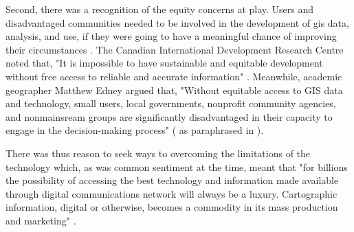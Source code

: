 \documentclass[notitlepage]{article}
\begin{document}
%

Second, there was a recognition of the equity concerns at play. Users and disadvantaged communities needed to be involved in the development of \ac{gis} data, analysis, and use, if they were going to have a meaningful chance of improving their circumstances \cite{talenBottomUpGIS2000}. The Canadian International Development Research Centre noted that, "It is impossible to have sustainable and equitable development without free access to reliable and accurate information" \cite{benmouffokInformationDecisionMaking1993}. Meanwhile, academic geographer Matthew Edney argued that, "Without equitable access to GIS data and technology, small users, local governments, nonprofit community agencies, and nonmainsream groups are significantly disadvantaged in their capacity to engage in the decision-making process" (\cite{edney1991strategies} as paraphrased in \cite{harrisPursuingSocialGoals1994}). 

There was thus reason to seek ways to overcoming the limitations of the technology which, as was common sentiment at the time, meant that "for billions the possibility of accessing the best technology and information made available through digital communications network will always be a luxury. Cartographic information, digital or otherwise, becomes a commodity in its mass production and marketing" \cite{mchaffieManufacturingMetaphors1994}. 
\end{document}
